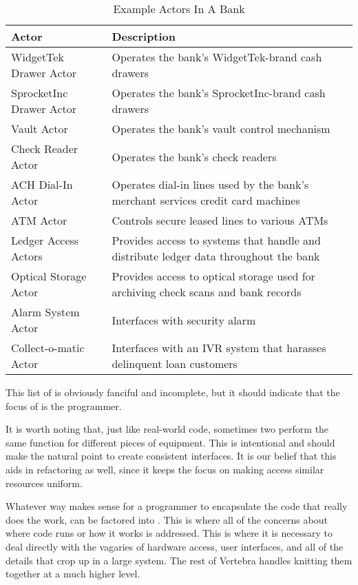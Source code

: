 \begin{table}
        \begin{center}
                \begin{tabular}{|p{}|p{}|}
                        \hline Actor & Description \\
                        \hline
                        \hline WidgetTek Drawer Actor & Operates the bank's WidgetTek-brand cash drawers \\
                        \hline SprocketInc Drawer Actor & Operates the bank's SprocketInc-brand cash drawers \\
                        \hline Vault Actor & Operates the bank's vault control mechanism \\
                        \hline Check Reader Actor & Operates the bank's check readers \\
                        \hline ACH Dial-In Actor & Operates dial-in lines used by the bank's merchant services credit card machines \\
                        \hline ATM Actor & Controls secure leased lines to various ATMs \\
                        \hline Ledger Access Actors & Provides access to systems that handle and distribute ledger data throughout the bank \\
                        \hline Optical Storage Actor & Provides access to optical storage used for archiving check scans and bank records \\
                        \hline Alarm System Actor & Interfaces with security alarm \\
                        \hline Collect-o-matic Actor & Interfaces with an IVR system that harasses delinquent loan customers \\
                        \hline
                \end{tabular}
        \end{center}
        \caption{Example Actors In A Bank}
        \label{tbl:bank-actors}
\end{table}

This list of \actors{} is obviously fanciful and incomplete, but it should indicate that the focus of \actors{} is the programmer.

It is worth noting that, just like real-world code, sometimes two \actors{} perform the same function for different pieces of equipment.  This is intentional and should make \actors{} the natural point to create consistent interfaces.  It is our belief that this aids in refactoring as well, since it keeps the focus on making access similar resources uniform.

Whatever way makes sense for a programmer to encapsulate the code that really does the work, can be factored into \actors{}.  This is where all of the concerns about where code runs or how it works is addressed.  This is where it is necessary to deal directly with the vagaries of hardware access, user interfaces, and all of the details that crop up in a large system.  The rest of Vertebra handles knitting them together at a much higher level.
